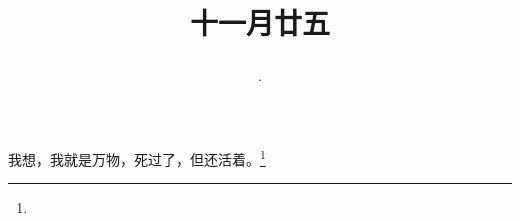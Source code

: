 \title{\date[d=25,m=12,y=2024][year:cn-y,年,month:cn,day:cn,日,·,weekday]·十一月廿五 }
我想，我就是万物，死过了，但还活着。\footnote{ }

